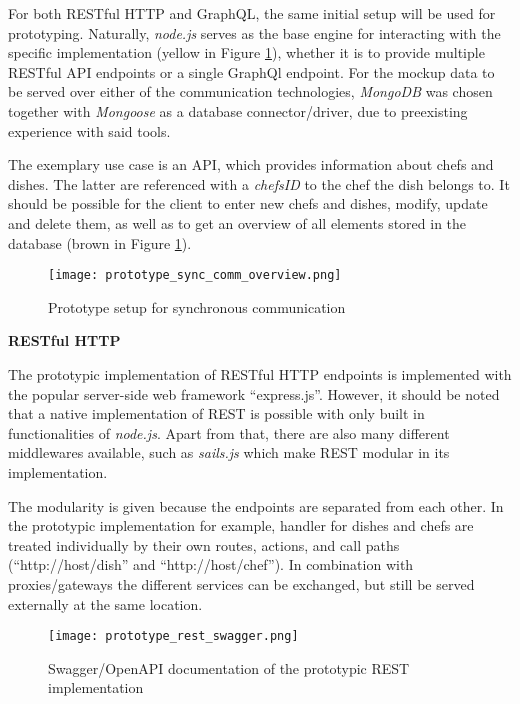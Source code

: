 
For both RESTful \ac{HTTP} and GraphQL, the same initial setup will be used for prototyping.
Naturally, \textit{node.js} serves as the base engine for interacting with the specific implementation (yellow in Figure \ref{img:prototypesynccomm}), whether it is to provide multiple RESTful \ac{API} endpoints or a single GraphQl endpoint.
For the mockup data to be served over either of the communication technologies, \textit{MongoDB} was chosen together with \textit{Mongoose} as a database connector/driver, due to preexisting experience with said tools.

The exemplary use case is an \ac{API}, which provides information about chefs and dishes. The latter are referenced with a \textit{chefsID} to the chef the dish belongs to.
It should be possible for the client to enter new chefs and dishes, modify, update and delete them, as well as to get an overview of all elements stored in the database (brown in Figure \ref{img:prototypesynccomm}).

\begin{figure}[h]
	\centering
	\texttt{[image: prototype\_sync\_comm\_overview.png]}
	\caption{Prototype setup for synchronous communication}
	\label{img:prototypesynccomm}
\end{figure}

\pagebreak
\textbf{RESTful HTTP}

The prototypic implementation of RESTful \ac{HTTP} endpoints is implemented with the popular server-side web framework \enquote{express.js}.
However, it should be noted that a native implementation of REST is possible with only built in functionalities of \textit{node.js}.
Apart from that, there are also many different middlewares available, such as \textit{sails.js} which make REST modular in its implementation.

The modularity is given because the endpoints are separated from each other.
In the prototypic implementation for example, handler for dishes and chefs are treated individually by their own routes, actions, and call paths (\enquote{http://host/dish} and \enquote{http://host/chef}).
In combination with proxies/gateways the different services can be exchanged, but still be served externally at the same location.

\begin{figure}[h]
	\centering
	\texttt{[image: prototype\_rest\_swagger.png]}
	\caption{Swagger/OpenAPI documentation of the prototypic REST implementation}
	\label{img:prototyperestswagger}
\end{figure}

